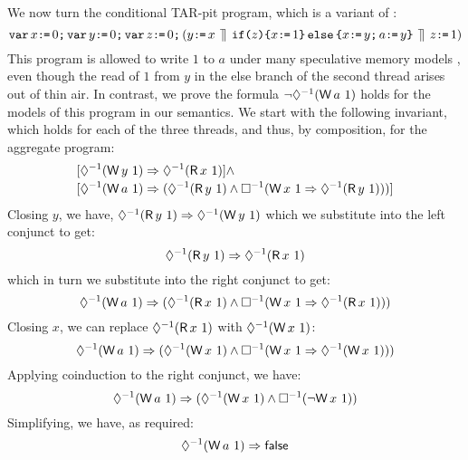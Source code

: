 We now turn the conditional TAR-pit program, which is a variant of \cite[Figure 8]{DBLP:journals/toplas/Lochbihler13}:
\begin{displaymath}
  \VAR x\GETS0\SEMI \VAR y\GETS0\SEMI \VAR z\GETS0\SEMI  %
  (
    y\GETS x
  \PAR
    \IF{z}\THEN x\GETS1 \ELSE x\GETS y\SEMI a\GETS y \FI
  \PAR
    z\GETS1
  )
\end{displaymath}
This program is allowed to write $1$ to $a$ under many speculative
memory models
\cite{Manson:2005:JMM:1047659.1040336,DBLP:conf/esop/JagadeesanPR10,DBLP:conf/popl/KangHLVD17},
even though the read of $1$ from $y$ in the else branch of the second
thread arises out of thin air.   In contrast, we prove the formula
\begin{math}
  \lnot\once(\DW{a}{1})
\end{math}
holds for the models of this program in our semantics.  We start with the following invariant,
which holds for each of the three threads, and thus, by composition, for the
aggregate program:
\begin{align*}
  &[\once(\DW{y}{1}) \Rightarrow \once(\DR{x}{1})]
  \land\\[-.5ex]
  &[\once(\DW{a}{1}) \Rightarrow (\once(\DR{y}{1}) \land \always(\DW{x}{1} \Rightarrow \once(\DR{y}{1})))]
\end{align*}
Closing $y$, we have,
\begin{math}
  \once(\DR{y}{1}) \Rightarrow \once(\DW{y}{1}) %
\end{math}
which we substitute into the left conjunct to get:
\begin{displaymath}
  \once(\DR{y}{1}) \Rightarrow \once(\DR{x}{1})
\end{displaymath}
which in turn we substitute into the right conjunct to get:
\begin{displaymath}
  \once(\DW{a}{1}) \Rightarrow (\once(\DR{x}{1}) \land \always(\DW{x}{1} \Rightarrow \once(\DR{x}{1})))
\end{displaymath}
Closing $x$, we can replace $\once(\DR{x}{1})$ with $\once(\DW{x}{1})$:
\begin{displaymath}
  \once(\DW{a}{1}) \Rightarrow (\once(\DW{x}{1}) \land \always(\DW{x}{1} \Rightarrow \once(\DW{x}{1})))
\end{displaymath}
Applying coinduction to the right conjunct, we have:
\begin{displaymath}
  \once(\DW{a}{1}) \Rightarrow (\once(\DW{x}{1}) \land \always(\lnot \DW{x}{1}))
\end{displaymath}
Simplifying, we have, as required:  
\begin{displaymath}
  \once(\DW{a}{1}) \Rightarrow \FALSE
\end{displaymath}


